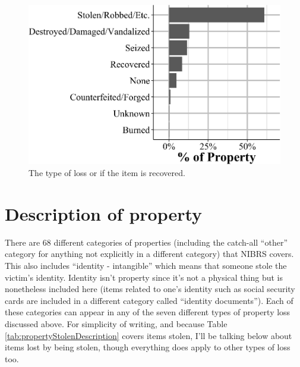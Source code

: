 \documentclass[
  12pt,
  openany]{book}
\begin{document}
\begin{figure}

{\centering \includegraphics[width=0.9\linewidth]{17_nibrs_property_files/figure-latex/propertyTypeLoss-1} 

}

\caption{The type of loss or if the item is recovered.}\label{fig:propertyTypeLoss}
\end{figure}

\section{Description of property}\label{description-of-property}

There are 68 different categories of properties (including the catch-all ``other'' category for anything not explicitly in a different category) that NIBRS covers. This also includes ``identity - intangible'' which means that someone stole the victim's identity. Identity isn't property since it's not a physical thing but is nonetheless included here (items related to one's identity such as social security cards are included in a different category called ``identity documents''). Each of these categories can appear in any of the seven different types of property loss discussed above. For simplicity of writing, and because Table \ref{tab:propertyStolenDescription} covers items stolen, I'll be talking below about items lost by being stolen, though everything does apply to other types of loss too.
\end{document}
